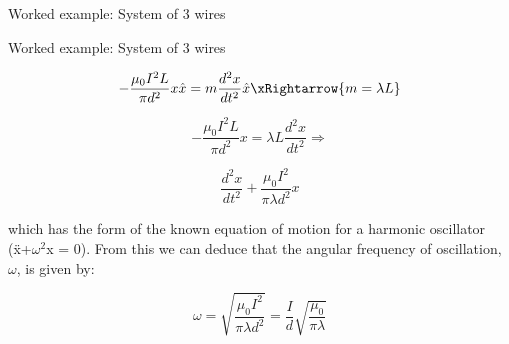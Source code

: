 {\begin{frame}{Worked example: System of 3 wires}
\end{frame}

%
%
%

\begin{frame}{Worked example: System of 3 wires}

  \begin{equation*}
      - \frac{\mu_0 I^2 L}{\pi d^2} x \hat{x} = m \frac{d^2 x}{dt^2} \hat{x}
      \xRightarrow{m = \lambda L}
  \end{equation*}

  \begin{equation*}
      - \frac{\mu_0 I^2 L}{\pi d^2} x = \lambda L \frac{d^2 x}{dt^2} \Rightarrow
  \end{equation*}

  \begin{equation*}
     \frac{d^2 x}{dt^2} + \frac{\mu_0 I^2}{\pi \lambda d^2} x
  \end{equation*}

  which has the form of the known equation of
  motion for a harmonic oscillator (\"x+$\omega^2$x = 0).
  From this we can deduce that the angular frequency of oscillation, $\omega$,
  is given by:

  \begin{equation*}
     \omega = \sqrt{\frac{\mu_0 I^2}{\pi \lambda d^2}} =
      \frac{I}{d} \sqrt{\frac{\mu_0}{\pi \lambda}}
  \end{equation*}

\end{frame}

} %


